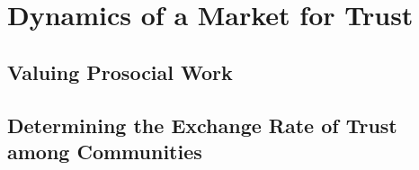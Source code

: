 \section{\textbf{Dynamics of a Market for Trust}}

\subsection{Valuing Prosocial Work}

\subsection{Determining the Exchange Rate of Trust among Communities}

\newpage
\newpage

